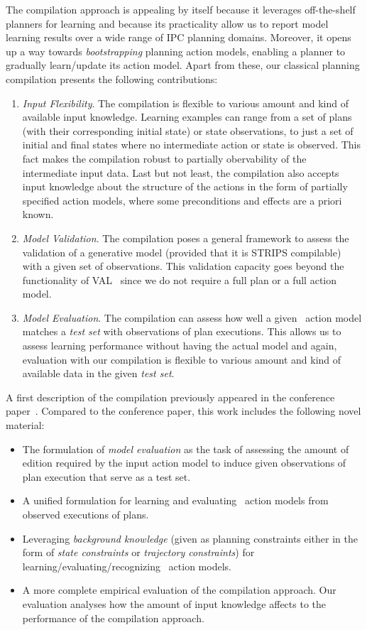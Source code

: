 The compilation approach is appealing by itself because it leverages off-the-shelf planners for learning and because its practicality allow us to report model learning results over a wide range of IPC planning domains. Moreover, it opens up a way towards \emph{bootstrapping} planning action models, enabling a planner to gradually learn/update its action model. Apart from these, our classical planning compilation presents the following contributions:
\begin{enumerate}
\item {\em Input Flexibility}. The compilation is flexible to various amount and kind of available input knowledge. Learning examples can range from a set of plans (with their corresponding initial state) or state observations, to just a set of initial and final states where no intermediate action or state is observed. This fact makes the compilation robust to partially obervability of the intermediate input data. Last but not least, the compilation also accepts input knowledge about the structure of the actions in the form of partially specified action models, where some preconditions and effects are a priori known. %

\item {\em Model Validation}. The compilation poses a general framework to assess the validation of a generative model (provided that it is STRIPS compilable) with a given set of observations. This validation capacity goes beyond the functionality of VAL~\cite{howey2004val} since we do not require a full plan or a full action model.
  
\item {\em Model Evaluation}. The compilation can assess how well a given \strips\ action model matches a {\em test set} with observations of plan executions. This allows us to assess learning performance without having the actual model and again, evaluation with our compilation is flexible to various amount and kind of available data in the given {\em test set}. 
\end{enumerate}

A first description of the compilation previously appeared in the conference paper~\cite{aineto2018learning}. Compared to the conference paper, this work includes the following novel material:
\begin{itemize}
\item The formulation of {\em model evaluation} as the task of assessing the amount of edition required by the input action model to induce given observations of plan execution that serve as a test set.
\item A unified formulation for learning and evaluating \strips\ action models from observed executions of plans.
\item Leveraging {\em background knowledge} (given as planning constraints either in the form of {\em state constraints} or {\em trajectory constraints}) for learning/evaluating/recognizing \strips\ action models.
\item A more complete empirical evaluation of the compilation approach. Our evaluation analyses how the amount of input knowledge affects to the performance of the compilation approach.
\end{itemize}

